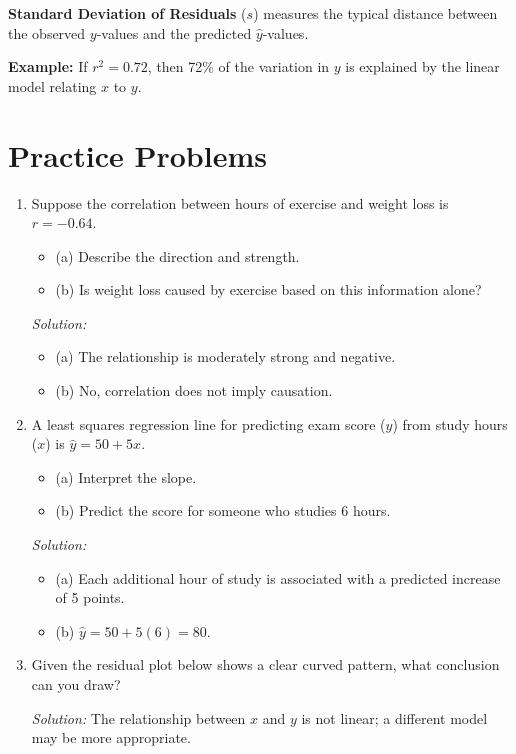\textbf{Standard Deviation of Residuals} (\(s\)) measures the typical distance between the observed \(y\)-values and the predicted \(\hat{y}\)-values.

\begin{example}
\textbf{Example:} If \(r^2 = 0.72\), then 72\% of the variation in \(y\) is explained by the linear model relating \(x\) to \(y\).
\end{example}

\section*{Practice Problems}

\begin{enumerate}
    \item Suppose the correlation between hours of exercise and weight loss is \(r = -0.64\).
    \begin{itemize}
        \item (a) Describe the direction and strength.
        \item (b) Is weight loss caused by exercise based on this information alone?
    \end{itemize}

    \vspace{0.5em}
    \textit{Solution:}
    \begin{itemize}
        \item (a) The relationship is moderately strong and negative.
        \item (b) No, correlation does not imply causation.
    \end{itemize}

    \item A least squares regression line for predicting exam score (\(y\)) from study hours (\(x\)) is \(\hat{y} = 50 + 5x\).
    \begin{itemize}
        \item (a) Interpret the slope.
        \item (b) Predict the score for someone who studies 6 hours.
    \end{itemize}

    \vspace{0.5em}
    \textit{Solution:}
    \begin{itemize}
        \item (a) Each additional hour of study is associated with a predicted increase of 5 points.
        \item (b) \(\hat{y} = 50 + 5(6) = 80\).
    \end{itemize}

    \item Given the residual plot below shows a clear curved pattern, what conclusion can you draw?

    \vspace{0.5em}
    \textit{Solution:} The relationship between \(x\) and \(y\) is not linear; a different model may be more appropriate.
\end{enumerate}


